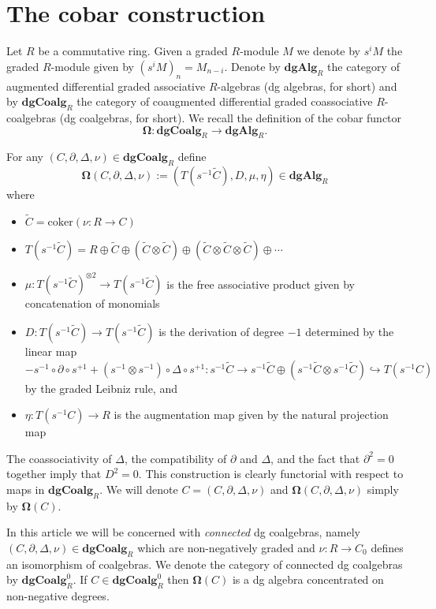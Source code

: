 \section{The cobar construction}

Let $R$ be a commutative ring. Given a graded $R$-module $M$ we denote by $s^{i}M$ the graded $R$-module given by $(s^{i}M)_n= M_{n-i}$.
Denote by $\textbf{dgAlg}_R$ the category of augmented differential graded associative $R$-algebras (dg algebras, for short) and by $\textbf{dgCoalg}_R$ the category of coaugmented differential graded coassociative $R$-coalgebras (dg coalgebras, for short). We recall the definition of the cobar functor 
$$\mathbf{\Omega}: \textbf{dgCoalg}_R \to \textbf{dgAlg}_R.$$

For any $(C, \partial, \Delta, \nu)  \in \textbf{dgCoalg}_R$ define
$$\mathbf{\Omega}(C, \partial, \Delta, \nu) := ( T(s^{-1}  \widetilde{C} ), D, \mu, \eta) \in \textbf{dgAlg}_R$$ where 
\begin{itemize}
\item $\widetilde{C}=\text{coker}(\nu: R \to C)$
\item $T(s^{-1} \widetilde{C})= R \oplus \widetilde{C} \oplus (\widetilde{C}  \otimes \widetilde{C} ) \oplus ( \widetilde{C} \otimes \widetilde{C} \otimes \widetilde{C} ) \oplus\cdots $
\item $\mu: T(s^{-1}  \widetilde{C} )^{\otimes 2} \to T(s^{-1}  \widetilde{C} ) $ is the free associative product given by concatenation of monomials
\item $D: T(s^{-1}  \widetilde{C} ) \to T(s^{-1}  \widetilde{C} )$ is the derivation of degree $-1$ determined by the linear map $$- s^{-1} \circ \partial \circ s^{+1} + (s^{-1} \otimes s^{-1}) \circ \Delta \circ s^{+1}: s^{-1}\widetilde{C} \to s^{-1}\widetilde{C} \oplus (s^{-1}\widetilde{C} \otimes s^{-1}\widetilde{C}) \hookrightarrow T(s^{-1}C)$$  by the graded Leibniz rule, and
\item $\eta: T(s^{-1}C) \to R$ is the augmentation map given by the natural projection map
\end{itemize}

The coassociativity of $\Delta$, the compatibility of $\partial$ and $\Delta$, and the fact that $\partial^2 =0$ together imply that $D^2=0$. This construction is clearly functorial with respect to maps in $\textbf{dgCoalg}_R$. We will denote $C=(C, \partial, \Delta, \nu)$ and $\mathbf{\Omega} (C, \partial, \Delta, \nu)$ simply by $\mathbf{\Omega}(C)$. 

In this article we will be concerned with \textit{connected} dg coalgebras, namely $(C, \partial, \Delta, \nu) \in \textbf{dgCoalg}_R$ which are non-negatively graded and $\nu: R \to C_0$ defines an isomorphism of coalgebras. We denote the category of connected dg coalgebras by $\textbf{dgCoalg}^0_R$. If $C \in \textbf{dgCoalg}_R^0$ then $\mathbf{\Omega}(C)$ is a dg algebra concentrated on non-negative degrees. 

